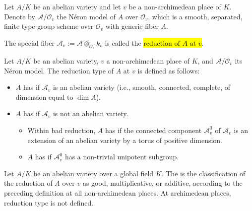 \begin{notation}
Let $A/K$ be an abelian variety and let $v$ be a non-archimedean place of $K$.  
Denote by $\mathcal{A}/\mathcal{O}_v$ the Néron model of $A$ over $\mathcal{O}_v$, which is a smooth, separated, finite type group scheme over $\mathcal{O}_v$ with generic fiber $A$.

The special fiber $\mathcal{A}_v := \mathcal{A} \otimes_{\mathcal{O}_v} k_v$ is called the \hl{$\text{reduction of $A$ at $v$}$}.  
\end{notation}

\begin{definition}
Let $A/K$ be an abelian variety, $v$ a non-archimedean place of $K$, and $\mathcal{A}/\mathcal{O}_v$ its Néron model.  
The reduction type of $A$ at $v$ is defined as follows:

\begin{itemize}
    \item $A$ has  if $\mathcal{A}_v$ is an abelian variety (i.e., smooth, connected, complete, of dimension equal to $\dim A$).
    \item $A$ has  if $\mathcal{A}_v$ is not an abelian variety.
        \begin{itemize}
            \item Within bad reduction, $A$ has  if the connected component $\mathcal{A}_v^0$ of $\mathcal{A}_v$ is an extension of an abelian variety by a torus of positive dimension.
            \item $A$ has  if $\mathcal{A}_v^0$ has a non-trivial unipotent subgroup.
        \end{itemize}
\end{itemize}
\end{definition}

\begin{definition}
Let $A/K$ be an abelian variety over a global field $K$.  
The  is the classification of the reduction of $A$ over $v$ as good, multiplicative, or additive, according to the preceding definition at all non-archimedean places. At archimedean places, reduction type is not defined.
\end{definition}



